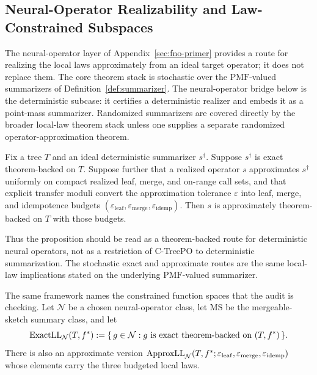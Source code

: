 \subsection{Neural-Operator Realizability and Law-Constrained Subspaces}\label{app:realizability-layer}

The neural-operator layer of Appendix~\ref{sec:fno-primer} provides a
route for realizing the local laws approximately from an ideal target
operator; it does not replace them. The core theorem stack is stochastic
over the $\mathrm{PMF}$-valued summarizers of Definition~\ref{def:summarizer}.
The neural-operator bridge below is the deterministic subcase: it
certifies a deterministic realizer and embeds it as a point-mass
summarizer. Randomized summarizers are covered directly by the broader
local-law theorem stack unless one supplies a separate randomized
operator-approximation theorem.

\begin{proposition}\label{prop:neural-operator-bridge}
Fix a tree $T$ and an ideal deterministic summarizer $s^\dagger$.
Suppose $s^\dagger$ is exact theorem-backed on $T$. Suppose further that
a realized operator $s$ approximates $s^\dagger$ uniformly on compact
realized leaf, merge, and on-range call sets, and that explicit
transfer moduli convert the approximation tolerance $\varepsilon$ into
leaf, merge, and idempotence budgets
$(\varepsilon_{\mathrm{leaf}}, \varepsilon_{\mathrm{merge}},
\varepsilon_{\mathrm{idemp}})$. Then $s$ is approximately
theorem-backed on $T$ with those budgets.
\end{proposition}

Thus the proposition should be read as a theorem-backed route for
deterministic neural operators, not as a restriction of C-TreePO to
deterministic summarization. The stochastic exact and approximate
routes are the same local-law implications stated on the underlying
$\mathrm{PMF}$-valued summarizer.

The same framework names the constrained function spaces that the
audit is checking. Let $\mathcal{N}$ be a chosen neural-operator class,
let $\mathrm{MS}$ be the mergeable-sketch summary class, and let
\[
\mathrm{ExactLL}_{\mathcal{N}}(T,f^\ast)
  := \{\,g\in\mathcal{N}: g \text{ is exact theorem-backed on }(T,f^\ast)\,\}.
\]
There is also an approximate version
$\mathrm{ApproxLL}_{\mathcal{N}}(T,f^\ast;\varepsilon_{\mathrm{leaf}},
\varepsilon_{\mathrm{merge}},\varepsilon_{\mathrm{idemp}})$ whose elements carry
the three budgeted local laws.

